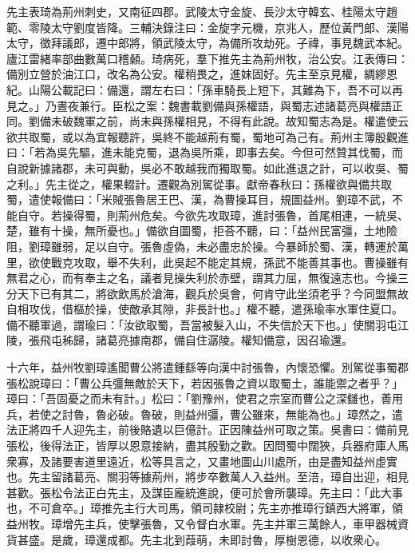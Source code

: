 \begin{pinyinscope}
先主表琦為荊州刺史，又南征四郡。武陵太守金旋、長沙太守韓玄、桂陽太守趙範、零陵太守劉度皆降。三輔決錄注曰：金旋字元機，京兆人，歷位黃門郎、漢陽太守，徵拜議郎，遷中郎將，領武陵太守，為備所攻劫死。子禕，事見魏武本紀。廬江雷緒率部曲數萬口稽顙。琦病死，羣下推先主為荊州牧，治公安。江表傳曰：備別立營於油江口，改名為公安。權稍畏之，進妹固好。先主至京見權，綢繆恩紀。山陽公載記曰：備還，謂左右曰：「孫車騎長上短下，其難為下，吾不可以再見之。」乃晝夜兼行。臣松之案：魏書載劉備與孫權語，與蜀志述諸葛亮與權語正同。劉備未破魏軍之前，尚未與孫權相見，不得有此說。故知蜀志為是。權遣使云欲共取蜀，或以為宜報聽許，吳終不能越荊有蜀，蜀地可為己有。荊州主簿殷觀進曰：「若為吳先驅，進未能克蜀，退為吳所乘，即事去矣。今但可然贊其伐蜀，而自說新據諸郡，未可與動，吳必不敢越我而獨取蜀。如此進退之計，可以收吳、蜀之利。」先主從之，權果輟計。遷觀為別駕從事。獻帝春秋曰：孫權欲與備共取蜀，遣使報備曰：「米賊張魯居王巴、漢，為曹操耳目，規圖益州。劉璋不武，不能自守。若操得蜀，則荊州危矣。今欲先攻取璋，進討張魯，首尾相連，一統吳、楚，雖有十操，無所憂也。」備欲自圖蜀，拒荅不聽，曰：「益州民富彊，土地險阻，劉璋雖弱，足以自守。張魯虛偽，未必盡忠於操。今暴師於蜀、漢，轉運於萬里，欲使戰克攻取，舉不失利，此吳起不能定其規，孫武不能善其事也。曹操雖有無君之心，而有奉主之名，議者見操失利於赤壁，謂其力屈，無復遠志也。今操三分天下已有其二，將欲飲馬於滄海，觀兵於吳會，何肯守此坐須老乎？今同盟無故自相攻伐，借樞於操，使敵承其隙，非長計也。」權不聽，遣孫瑜率水軍住夏口。備不聽軍過，謂瑜曰：「汝欲取蜀，吾當被髮入山，不失信於天下也。」使關羽屯江陵，張飛屯秭歸，諸葛亮據南郡，備自住潺陵。權知備意，因召瑜還。

十六年，益州牧劉璋遙聞曹公將遣鍾繇等向漢中討張魯，內懷恐懼。別駕從事蜀郡張松說璋曰：「曹公兵彊無敵於天下，若因張魯之資以取蜀土，誰能禦之者乎？」璋曰：「吾固憂之而未有計。」松曰：「劉豫州，使君之宗室而曹公之深讎也，善用兵，若使之討魯，魯必破。魯破，則益州彊，曹公雖來，無能為也。」璋然之，遣法正將四千人迎先主，前後賂遺以巨億計。正因陳益州可取之策。吳書曰：備前見張松，後得法正，皆厚以恩意接納，盡其殷勤之歡。因問蜀中闊狹，兵器府庫人馬衆寡，及諸要害道里遠近，松等具言之，又畫地圖山川處所，由是盡知益州虛實也。先主留諸葛亮、關羽等據荊州，將步卒數萬人入益州。至涪，璋自出迎，相見甚歡。張松令法正白先主，及謀臣龐統進說，便可於會所襲璋。先主曰：「此大事也，不可倉卒。」璋推先主行大司馬，領司隷校尉；先主亦推璋行鎮西大將軍，領益州牧。璋增先主兵，使擊張魯，又令督白水軍。先主并軍三萬餘人，車甲器械資貨甚盛。是歲，璋還成都。先主北到葭萌，未即討魯，厚樹恩德，以收衆心。


\end{pinyinscope}

